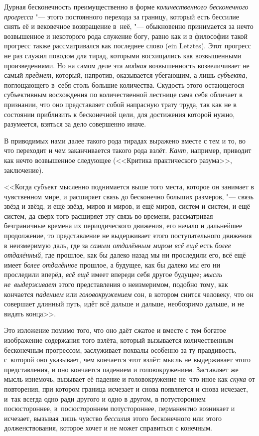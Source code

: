 
Дурная бесконечность преимущественно в форме
{\em количественного бесконечного прогресса} "--- этого постоянного перехода за
границу, который есть бессилие снять её и вековечное возвращение в~неё,
"--- обыкновенно принимается за нечто возвышенное и некоторого рода служение
богу, равно как и в философии такой прогресс также рассматривался как последнее
слово (ein Letz\-tes). Этот прогресс не раз служил поводом для тирад, которыми
восхищались как возвышенными произведениями. Но на самом деле эта {\em модная}
возвышенность возвеличивает не самый {\em предмет,} который, напротив,
оказывается убегающим, а лишь {\em субъекта,} поглощающего в~себя столь большие
количества. Скудость этого остающегося субъективным восхождения по
количественной лестнице сама себя обличает в признании, что оно представляет
собой напрасную трату труда, так как не в состоянии приблизить к бесконечной
цели, для достижения которой нужно, разумеется, взяться за дело совершенно
иначе.

В приводимых нами далее такого рода тирадах выражено вместе с тем и то, во что
переходит и чем заканчивается такого рода взлёт. {\em Кант,} например, приводит
как нечто возвышенное следующее (<<Критика практического разума>>, заключение).

<<Когда субъект мысленно поднимается выше того места, которое он занимает в
чувственном мире, и расширяет связь до бесконечно больших размеров, "--- связь
звёзд и звёзд, и ещё звёзд, миров и миров, и ещё миров, систем и систем, и ещё
систем, да сверх того расширяет эту связь во времени, рассматривая безграничные
времена их периодического движения, его начало и дальнейшее продолжение, то
представление не выдерживает этого поступательного движения в неизмеримую даль,
где за {\em самым отдалённым миром всё ещё} есть {\em более отдалённый,} где
прошлое, как бы далеко назад мы ни проследили его, всё ещё имеет
{\em более отдалённое} прошлое, а будущее, как бы далеко мы его ни проследили
вперёд, {\em всё ещё} имеет впереди себя другое будущее;
{\em мысль не~выдерживает} этого представления о неизмеримом, подобно тому, как
кончается {\em падением} или {\em головокружением} сон, в котором снится
человеку, что он совершает длинный путь, идёт всё дальше и дальше, необозримо
дальше, и не видать конца>>.

Это изложение помимо того, что оно даёт сжатое и вместе с тем богатое
изображение содержания того взлёта, который вызывается количественным
бесконечным прогрессом, заслуживает похвалы особенно за ту правдивость,
с~которой оно указывает, чем кончается этот взлёт: мысль не выдерживает этого
представления, и оно кончается падением и головокружением. Заставляет же мысль
изнемочь, вызывает её падение и головокружение не~что иное как {\em скука} от
повторения, при котором граница исчезает и снова появляется и снова исчезает,
и~так всегда одно ради другого и одно в другом, в потустороннем посюстороннее,
в~посюстороннем потустороннее, перманентно возникает и исчезает, вызывая лишь
чувство {\em бессилия} этого бесконечного или этого долженствования, которое
хочет и не может справиться с конечным.

